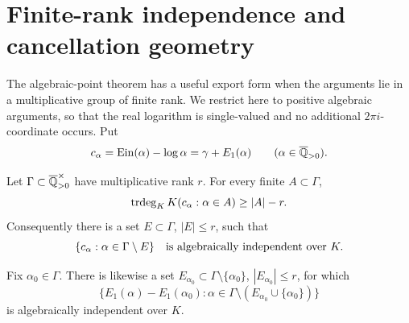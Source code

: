 \section{Finite-rank independence and cancellation geometry}
\label{sec:rank-deficit}

The algebraic-point theorem has a useful export form when the arguments lie
in a multiplicative group of finite rank.  We restrict here to positive
algebraic arguments, so that the real logarithm is single-valued and no
additional \(2\pi i\)-coordinate occurs.  Put
\begin{equation}\label{eq:c-alpha}
 c_\alpha=\operatorname{Ein}(\alpha)-\log\alpha=\gamma+E_1(\alpha)
 \qquad(\alpha\in\overline{\mathbb Q}_{>0}).
\end{equation}

\begin{theorem}
\label{thm:cofinite-independence}
Let \(\Gamma\subset\overline{\mathbb Q}_{>0}^{\times}\) have multiplicative rank \(r\).
For every finite \(A\subset\Gamma\),
\begin{equation}\label{eq:finite-rank-deficit}
 \operatorname{trdeg}_KK(c_\alpha:\alpha\in A)\ge |A|-r.
\end{equation}
Consequently there is a set \(E\subset\Gamma\), \(|E|\le r\), such that
\begin{equation}\label{eq:cofinite-family}
 \{c_\alpha:\alpha\in\Gamma\setminus E\}
 \quad\hbox{is algebraically independent over }K.
\end{equation}

Fix \(\alpha_0\in\Gamma\).  There is likewise a set
\(E_{\alpha_0}\subset\Gamma\setminus\{\alpha_0\}\),
\(|E_{\alpha_0}|\le r\), for which
\begin{equation}\label{eq:cofinite-differences}
 \{E_1(\alpha)-E_1(\alpha_0):
 \alpha\in\Gamma\setminus(E_{\alpha_0}\cup\{\alpha_0\})\}
\end{equation}
is algebraically independent over \(K\).
\end{theorem}

